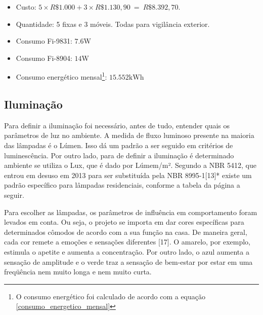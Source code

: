 \begin{itemize}
\item Custo: $5\times R\$ 1.000 + 3\times R\$1.130,90\ =\ R\$ 8.392,70$.
\item Quantidade: 5 fixas e 3 móveis. Todas para vigilância exterior.
\item Consumo Fi-9831: $7.6 \si{\watt}$
\item Consumo Fi-8904: $14 \si{\watt}$
\item Consumo energético mensal\footnote{O consumo energético foi calculado de acordo com a equação \ref{consumo_energetico_mensal}}: $15.552 \si{\kilo\watt\hour}$
\end{itemize}

\subsection{Iluminação}

	Para definir a iluminação foi necessário, antes de tudo, entender quais os parâmetros de luz no ambiente. A medida de fluxo luminoso presente na maioria das lâmpadas é o Lúmen. Isso dá um padrão a ser seguido em critérios de luminescência. Por outro lado, para de definir a iluminação é determinado ambiente se utiliza o Lux, que é dado por Lúmem/m². Segundo a NBR 5412, que entrou em desuso em 2013 para ser substituída pela NBR 8995-1[13]* existe um padrão específico para lâmpadas residenciais, conforme a tabela da página a seguir.

	Para escolher as lâmpadas, os parâmetros de influência em comportamento foram levados em conta. Ou seja, o projeto se importa em dar cores específicas para determinados cômodos de acordo com a sua função na casa. De maneira geral, cada cor remete a emoções e sensações diferentes [17]. O amarelo, por exemplo, estimula o apetite e aumenta a concentração. Por outro lado, o azul aumenta a sensação de amplitude e o verde traz a sensação de bem-estar por estar em uma freqüência nem muito longa e nem muito curta. 

